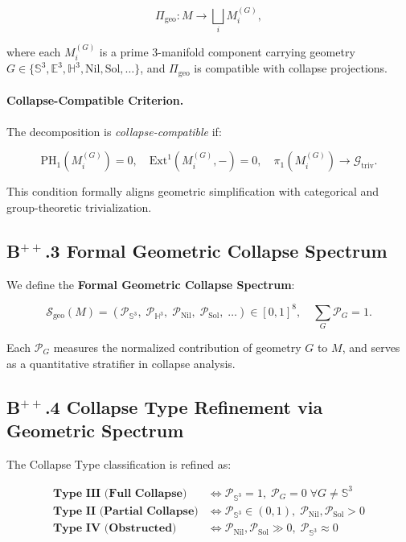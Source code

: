 \documentclass[11pt]{article}
\begin{document}
\[
\Pi_{\mathrm{geo}} : M \longrightarrow \bigsqcup_i M_i^{(G)},
\]

where each $M_i^{(G)}$ is a prime 3-manifold component carrying geometry $G \in \{ \mathbb{S}^3, \mathbb{E}^3, \mathbb{H}^3, \mathrm{Nil}, \mathrm{Sol}, \ldots \}$, and $\Pi_{\mathrm{geo}}$ is compatible with collapse projections.

\paragraph{Collapse-Compatible Criterion.}
The decomposition is \emph{collapse-compatible} if:

\[
\mathrm{PH}_1(M_i^{(G)}) = 0,\quad \mathrm{Ext}^1(M_i^{(G)}, -) = 0,\quad \pi_1(M_i^{(G)}) \longrightarrow \mathcal{G}_{\mathrm{triv}}.
\]

This condition formally aligns geometric simplification with categorical and group-theoretic trivialization.

\subsection*{B$^{++}$.3 Formal Geometric Collapse Spectrum}

We define the \textbf{Formal Geometric Collapse Spectrum}:

\[
\mathcal{S}_{\mathrm{geo}}(M) = \left( \mathcal{P}_{\mathbb{S}^3},\; \mathcal{P}_{\mathbb{H}^3},\; \mathcal{P}_{\mathrm{Nil}},\; \mathcal{P}_{\mathrm{Sol}},\; \ldots \right) \in [0,1]^8,\quad \sum_G \mathcal{P}_G = 1.
\]

Each $\mathcal{P}_G$ measures the normalized contribution of geometry $G$ to $M$, and serves as a quantitative stratifier in collapse analysis.

\subsection*{B$^{++}$.4 Collapse Type Refinement via Geometric Spectrum}

The Collapse Type classification is refined as:

\[
\begin{array}{ll}
\textbf{Type III (Full Collapse)} & \iff \mathcal{P}_{\mathbb{S}^3} = 1,\; \mathcal{P}_G = 0\; \forall G \neq \mathbb{S}^3 \\
\textbf{Type II (Partial Collapse)} & \iff \mathcal{P}_{\mathbb{S}^3} \in (0,1),\; \mathcal{P}_{\mathrm{Nil}}, \mathcal{P}_{\mathrm{Sol}} > 0 \\
\textbf{Type IV (Obstructed)} & \iff \mathcal{P}_{\mathrm{Nil}}, \mathcal{P}_{\mathrm{Sol}} \gg 0,\; \mathcal{P}_{\mathbb{S}^3} \approx 0
\end{array}
\]
\end{document}
